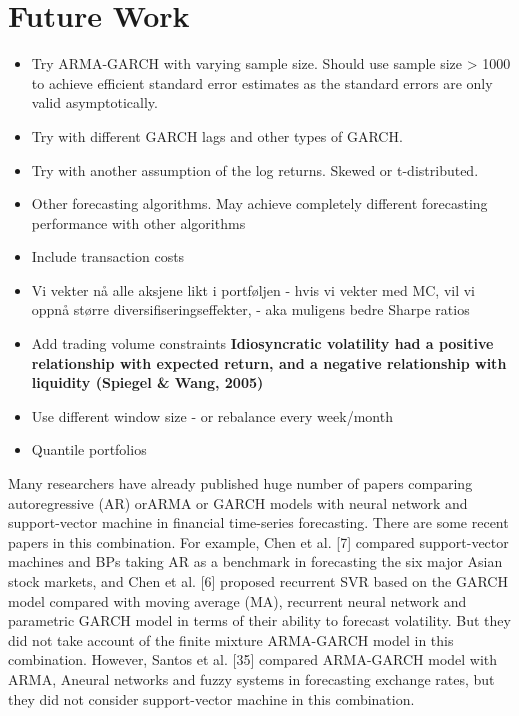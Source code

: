 \chapter{Future Work} \label{FutureWork}
\label{FW}

\begin{itemize}
    \item Try ARMA-GARCH with varying sample size. Should use sample size > 1000 to achieve efficient standard error estimates as the standard errors are only valid asymptotically.
    \item Try with different GARCH lags and other types of GARCH.
    \item Try with another assumption of the log returns. Skewed or t-distributed. 
    \item Other forecasting algorithms. May achieve completely different forecasting performance with other algorithms
    \item Include transaction costs
    \item Vi vekter nå alle aksjene likt i portføljen - hvis vi vekter med MC, vil vi oppnå større diversifiseringseffekter, - aka muligens bedre Sharpe ratios
    \item Add trading volume constraints \textbf{Idiosyncratic volatility had a positive relationship with expected return, and a negative relationship with liquidity (Spiegel & Wang, 2005)}
    \item Use different window size - or rebalance every week/month
    \item Quantile portfolios
\end{itemize}

Many researchers have already published huge number of papers comparing autoregressive (AR) orARMA or GARCH models with neural network and support-vector machine in financial time-series forecasting. There are some recent papers in this combination. For example, Chen et al. [7] compared support-vector machines and BPs taking AR as a benchmark in forecasting the six major Asian stock markets, and Chen et al. [6] proposed recurrent SVR based on the GARCH model compared with moving average (MA), recurrent neural network and parametric GARCH model in terms of their ability to forecast volatility. But they did not take account of the finite mixture ARMA-GARCH model in this combination. However, Santos et al. [35] compared ARMA-GARCH model with ARMA, Aneural networks and fuzzy systems in forecasting exchange rates, but they did not consider support-vector machine in this combination. 